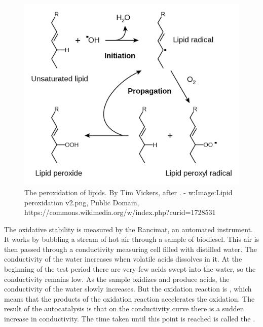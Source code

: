 \begin{figure}
\centering
\includegraphics[width=\textwidth]{Figures/1281px-Lipid_peroxidation.png}
\decoRule

\caption[The peroxidation of lipids.]{The peroxidation of lipids. By Tim
Vickers, after \autocite{Young2001}. - w:Image:Lipid peroxidation v2.png, Public
Domain, https://commons.wikimedia.org/w/index.php?curid=1728531}

\label{fig:RancidRadical}
\end{figure}



The oxidative stability is measured by the Rancimat, an automated instrument. It
works by bubbling a stream of hot air through a sample of biodiesel. This air is
then passed through a conductivity measuring cell filled with distilled water.
The conductivity of the water increases when volatile acids dissolves in it. At
the beginning of the test period there are very few acids swept into the water,
so the conductivity remains low. As the sample oxidizes and produce acids, the
conductivity of the water slowly increases. But the oxidation reaction is
, which means that the products of the oxidation reaction
accelerates the oxidation. The result of the autocatalysis is that on the
conductivity curve there is a sudden increase in conductivity. The time taken
until this point is reached is called the .

